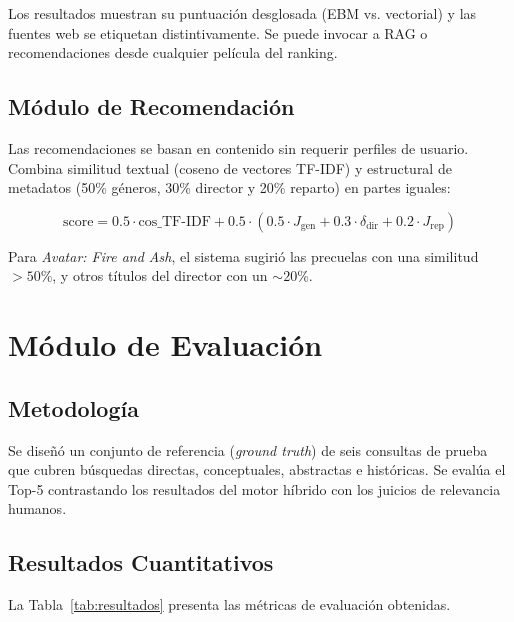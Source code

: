 \documentclass[10pt,a4paper]{llncs}
\begin{document}
Los resultados muestran su puntuación desglosada (EBM vs. vectorial) y las fuentes web se etiquetan distintivamente. Se puede invocar a RAG o recomendaciones desde cualquier película del ranking.

\subsection{Módulo de Recomendación}

Las recomendaciones se basan en contenido sin requerir perfiles de usuario. Combina similitud textual (coseno de vectores TF-IDF) y estructural de metadatos (50\% géneros, 30\% director y 20\% reparto) en partes iguales:

\begin{equation}
\text{score} = 0.5 \cdot \text{cos\_TF-IDF} + 0.5 \cdot (0.5 \cdot J_{\text{gen}} + 0.3 \cdot \delta_{\text{dir}} + 0.2 \cdot J_{\text{rep}})
\label{eq:recomendacion}
\end{equation}

Para \textit{Avatar: Fire and Ash}, el sistema sugirió las precuelas con una similitud $>50$\%, y otros títulos del director con un $\sim20$\%.

\section{Módulo de Evaluación}

\subsection{Metodología}

Se diseñó un conjunto de referencia (\textit{ground truth}) de seis consultas de prueba que cubren búsquedas directas, conceptuales, abstractas e históricas. Se evalúa el Top-5 contrastando los resultados del motor híbrido con los juicios de relevancia humanos.

\subsection{Resultados Cuantitativos}

La Tabla~\ref{tab:resultados} presenta las métricas de evaluación obtenidas.
\end{document}
